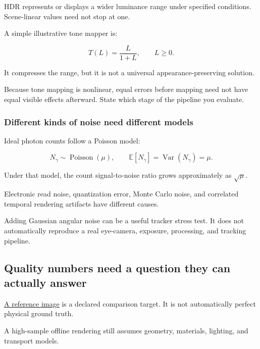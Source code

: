 HDR represents or displays a wider luminance range under specified conditions. Scene-linear values need not stop at one.

A simple illustrative tone mapper is:

\[
T(L)=\frac{L}{1+L},
\qquad L\geq0.
\]

It compresses the range, but it is not a universal appearance-preserving solution.

Because tone mapping is nonlinear, equal errors before mapping need not have equal visible effects afterward. State which stage of the pipeline you evaluate.

\subsubsection{Different kinds of noise need different models}\label{04-visual-computing-ii-ch042-different-kinds-of-noise-need-different-models}

\hypertarget{04-visual-computing-ii-ch042-different-kinds-of-noise-need-different-models}{}

Ideal photon counts follow a Poisson model:

\[
N_\gamma\sim\operatorname{Poisson}(\mu),
\qquad
\mathbb E[N_\gamma]=\operatorname{Var}(N_\gamma)=\mu.
\]

Under that model, the count signal-to-noise ratio grows approximately as \(\sqrt{\mu}\).

Electronic read noise, quantization error, Monte Carlo noise, and correlated temporal rendering artifacts have different causes.

Adding Gaussian angular noise can be a useful tracker stress test. It does not automatically reproduce a real eye-camera, exposure, processing, and tracking pipeline.

\subsection{Quality numbers need a question they can actually answer}\label{04-visual-computing-ii-ch042-quality-numbers-need-a-question-they-can-actually-answer}

\hypertarget{04-visual-computing-ii-ch042-quality-numbers-need-a-question-they-can-actually-answer}{}

\hyperref[appendix-b2c1846508bf]{A reference image} is a declared comparison target. It is not automatically perfect physical ground truth.

A high-sample offline rendering still assumes geometry, materials, lighting, and transport models.

